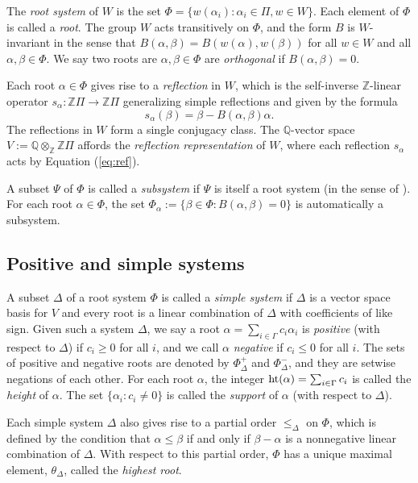 \documentclass[11pt]{amsart}
\theoremstyle{plain}
\theoremstyle{definition}
\theoremstyle{remark}
\numberwithin{equation}{subsection}
\newcommand{\al}{\alpha}
\newcommand{\be}{\beta}
\newcommand{\Q}{{\mathbb Q}}
\newcommand{\Z}{{\mathbb Z}}
\newcommand{\ra}{\rightarrow}
\newcommand{\fh}{V}
\newcommand{\simproots}{\Pi}
\newcommand{\allroots}{\Phi}
\newcommand{\rootht}{\text{\rm ht}}
\begin{document}
The {\it root system} of $W$  is the set $\allroots = \{w(\al_i) : \al_i \in
\Pi, w \in W\}$. Each element of $\allroots$ is called a \emph{root}. The group
$W$ acts transitively on $\allroots$, and the form $B$ is $W$-invariant in the
sense that $B(\al, \be) = B(w(\al), w(\be))$ for all $w \in W$ and all $\al, \be
\in \allroots$. We say two roots are $\al,\beta\in \allroots$ are
\emph{orthogonal} if $B(\al,\be)=0$.


Each root $\alpha\in \Phi$ gives rise to a \emph{reflection} in $W$, which is
the self-inverse $\Z$-linear operator $s_\al:\Z\Pi\ra\Z\Pi$ generalizing simple
reflections and given by the formula 
\begin{equation}
    \label{eq:ref} s_\al(\be) = \be - B(\al, \be)\al.
\end{equation} The reflections in $W$ form a single conjugacy class. The
    $\Q$-vector space $\fh := \Q \otimes_\Z \Z\simproots$ affords the {\it
    reflection representation} of $W$, where each reflection $s_\al$ acts by
    Equation (\ref{eq:ref}). 

A subset $\Psi$ of $\Phi$ is called a \emph{subsystem} if $\Psi$ is itself a
root system (in the sense of \cite[Section 1.2]{humphreys90}). For each root
$\al\in \Phi$, the set $\Phi_\al:=\{\beta\in \Phi:B(\al,\beta)=0\}$ is
automatically a subsystem.



\subsection{Positive and simple systems}

\label{sec:basics2}
A subset $\Delta$ of a root system $\allroots$ is called a \emph{simple system}
if $\Delta$ is a vector space basis for $V$ and every root is a linear
combination of $\Delta$ with coefficients of like sign.  Given such a system
$\Delta$, we say a root $\al = \sum_{i \in \Gamma} c_i \al_i$ is \emph{positive}
(with respect to $\Delta$) if $c_i\ge 0$ for all $i$, and we call $\al$
\emph{negative} if $c_i\le 0$ for all $i$. The sets of positive and negative
roots are denoted by $\Phi_\Delta^+$ and $\Phi_\Delta^-$, and they are setwise
negations of each other.  For each root $\al$, the integer $\rootht(\al) =
\sum_{i \in \Gamma} c_i$ is called the {\it height} of $\al$. The set
$\{\al_i:c_i\neq 0\}$ is called the \emph{support} of $\al$ (with respect to
$\Delta$).

Each simple system $\Delta$ also gives rise to a partial order $\le_\Delta$ on
$\Phi$, which is defined by the condition that $\al \leq \be$ if and only if
$\be - \al$ is a nonnegative linear combination of $\Delta$.  With respect to
this partial order, $\allroots$ has a unique maximal element, $\theta_\Delta$,
called the {\it highest root}. 
\end{document}
